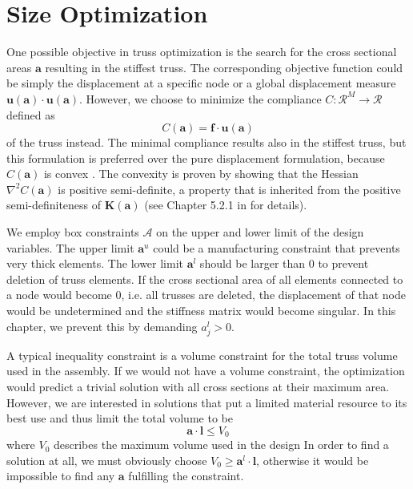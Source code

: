 \section{Size Optimization}
One possible objective in truss optimization is the search for the cross sectional areas $\mathbf{a}$ resulting in the stiffest truss. The corresponding objective function could be simply the displacement at a specific node or a global displacement measure $\mathbf{u} (\mathbf{a}) \cdot \mathbf{u} (\mathbf{a})$. However, we choose to minimize the compliance $C: \mathcal{R}^{M} \rightarrow \mathcal{R}$ defined as 
\begin{equation}
    C(\mathbf{a}) = \mathbf{f} \cdot \mathbf{u}(\mathbf{a})
\end{equation} 
of the truss instead. The minimal compliance results also in the stiffest truss, but this formulation is preferred over the pure displacement formulation, because $C(\mathbf{a})$ is convex \cite{Svanberg1984}. The convexity is proven by showing that the Hessian $\nabla^2 C(\mathbf{a})$ is positive semi-definite, a property that is inherited from the positive semi-definiteness of $\mathbf{K}(\mathbf{a})$ (see Chapter 5.2.1 in \cite{Christensen2008} for details).

We employ box constraints $\mathcal{A}$ on the upper and lower limit of the design variables. The upper limit $\mathbf{a}^u$ could be a manufacturing constraint that prevents very thick elements. The lower limit $\mathbf{a}^l$ should be larger than $0$ to prevent deletion of truss elements. If the cross sectional area of all elements connected to a node would become $0$, i.e. all trusses are deleted, the displacement of that node would be undetermined and the stiffness matrix would become singular. In this chapter, we prevent this by demanding $a_j^l > 0$.

A typical inequality constraint is a volume constraint for the total truss volume used in the assembly. If we would not have a volume constraint, the optimization would predict a trivial solution with all cross sections at their maximum area. However, we are interested in solutions that put a limited material resource to its best use and thus limit the total volume to be 
\begin{equation}
    \mathbf{a} \cdot \mathbf{l} \le V_0
\end{equation}
where $V_0$ describes the maximum volume used in the design
In order to find a solution at all, we must obviously choose $V_0 \ge \mathbf{a}^l \cdot \mathbf{l}$, otherwise it would be impossible to find any $\mathbf{a}$ fulfilling the constraint. 

